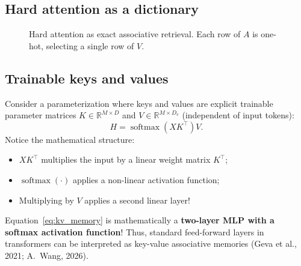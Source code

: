 \documentclass[11pt,a4paper]{article}
\newcommand{\R}{\mathbb{R}}
\DeclareMathOperator{\softmax}{softmax}
\newcommand{\slides}[1]{\par\nopagebreak\noindent{\normalfont\small\emph{(slides #1)}}\par\nopagebreak\vspace{2pt}}
\theoremstyle{definition}
\theoremstyle{plain}
\begin{document}
\subsection{Hard attention as a dictionary}\slides{33 / 84}
\begin{figure}[H]
\centering
{}
\caption{Hard attention as exact associative retrieval. Each row of $A$ is one-hot, selecting a single row of $V$.}\label{fig:hard_attn_vis}
\end{figure}

\subsection{Trainable keys and values}\slides{34 / 84}
Consider a parameterization where keys and values are explicit trainable parameter matrices $K \in \R^{M \times D}$ and $V \in \R^{M \times D_v}$ (independent of input tokens):
\begin{equation}\label{eq:kv_memory}
H = \softmax(X K^\top) V.
\end{equation}
Notice the mathematical structure:
\begin{itemize}[nosep]
\item $X K^\top$ multiplies the input by a linear weight matrix $K^\top$;
\item $\softmax(\cdot)$ applies a non-linear activation function;
\item Multiplying by $V$ applies a second linear layer!
\end{itemize}
Equation~\eqref{eq:kv_memory} is mathematically a \textbf{two-layer MLP with a softmax activation function}! Thus, standard feed-forward layers in transformers can be interpreted as key-value associative memories (Geva et al., 2021; A.\ Wang, 2026).
\end{document}
